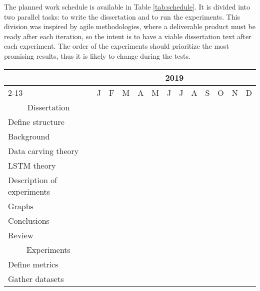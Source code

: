 The planned work schedule is available in Table \ref{tab:schedule}. It is divided into two parallel tasks: to write the dissertation and to run the experiments. This division was inspired by agile methodologies, where a deliverable product must be ready after each iteration, so the intent is to have a viable dissertation text after each experiment. The order of the experiments should prioritize the most promising results, thus it is likely to change during the tests.

\begin{table*}[!ht]
\centering
\caption{Schedule}
\label{tab:schedule}

\newcommand{\xxx}{\cellcolor{black}}

\begin{tabularx}{\textwidth}{| l | *{12}{X|}}
 \hline
 \multirow{2}{*}{}&\multicolumn{12}{c|}{2019}\\
 \cline{2-13}
 & J  & F & M & A & M & J & J & A & S & O & N & D\\
 \hline\hline
 \multicolumn{1}{|c}{Dissertation} & \multicolumn{12}{l|}{}\\
 \hline
 \hline
 Define structure
 &     &     &\xxx &     &     &     &     &     &     &     &     &    \\
 \hline
 Background
 &     &     &\xxx &     &     &     &     &     &     &     &     &    \\
 \hline
 Data carving theory
 &     &     &\xxx &     &     &     &     &     &     &     &     &    \\
 \hline
 LSTM theory
 &     &     &     &\xxx &\xxx &     &     &     &     &     &     &    \\
 \hline
 Description of experiments
 &     &     &     &     &\xxx &\xxx &\xxx &\xxx &\xxx &     &     &    \\
 \hline
 Graphs
 &     &     &     &     &     &     &     &     &     &\xxx &     &    \\
 \hline
 Conclusions
 &     &     &     &     &     &     &     &     &     &\xxx &     &    \\
 \hline
 Review
 &     &     &     &     &     &     &     &     &     &     &\xxx &    \\
 \hline
 \hline
 \multicolumn{1}{|c}{Experiments} & \multicolumn{12}{l|}{}\\
 \hline
 \hline
 Define metrics
 &     &     &\xxx &     &     &     &     &     &     &     &     &    \\
 \hline
 Gather datasets
 &     &     &\xxx &     &     &     &     &     &     &     &     &    \\

\end{tabularx}
\end{table*}
